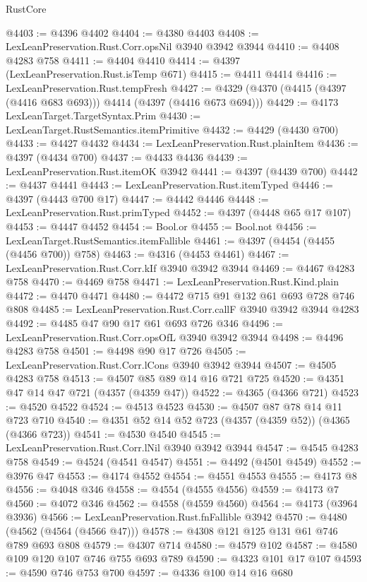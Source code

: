 \begin{lexlean}{RustCore}
\begin{coremodule}
@4403 := @4396 @4402
@4404 := @4380 @4403
@4408 := LexLeanPreservation.Rust.Corr.opsNil @3940 @3942 @3944
@4410 := @4408 @4283 @758
@4411 := @4404 @4410
@4414 := @4397 (LexLeanPreservation.Rust.isTemp @671)
@4415 := @4411 @4414
@4416 := LexLeanPreservation.Rust.tempFresh
@4427 := @4329 (@4370 (@4415 (@4397 (@4416 @683 @693))) @4414 (@4397 (@4416 @673 @694)))
@4429 := @4173 LexLeanTarget.TargetSyntax.Prim
@4430 := LexLeanTarget.RustSemantics.itemPrimitive
@4432 := @4429 (@4430 @700)
@4433 := @4427 @4432
@4434 := LexLeanPreservation.Rust.plainItem
@4436 := @4397 (@4434 @700)
@4437 := @4433 @4436
@4439 := LexLeanPreservation.Rust.itemOK @3942
@4441 := @4397 (@4439 @700)
@4442 := @4437 @4441
@4443 := LexLeanPreservation.Rust.itemTyped
@4446 := @4397 (@4443 @700 @17)
@4447 := @4442 @4446
@4448 := LexLeanPreservation.Rust.primTyped
@4452 := @4397 (@4448 @65 @17 @107)
@4453 := @4447 @4452
@4454 := Bool.or
@4455 := Bool.not
@4456 := LexLeanTarget.RustSemantics.itemFallible
@4461 := @4397 (@4454 (@4455 (@4456 @700)) @758)
@4463 := @4316 (@4453 @4461)
@4467 := LexLeanPreservation.Rust.Corr.kIf @3940 @3942 @3944
@4469 := @4467 @4283 @758
@4470 := @4469 @758
@4471 := LexLeanPreservation.Rust.Kind.plain
@4472 := @4470 @4471
@4480 := @4472 @715 @91 @132 @61 @693 @728 @746 @808
@4485 := LexLeanPreservation.Rust.Corr.callF @3940 @3942 @3944 @4283
@4492 := @4485 @47 @90 @17 @61 @693 @726 @346
@4496 := LexLeanPreservation.Rust.Corr.opsOfL @3940 @3942 @3944
@4498 := @4496 @4283 @758
@4501 := @4498 @90 @17 @726
@4505 := LexLeanPreservation.Rust.Corr.lCons @3940 @3942 @3944
@4507 := @4505 @4283 @758
@4513 := @4507 @85 @89 @14 @16 @721 @725
@4520 := @4351 @47 @14 @47 @721 (@4357 (@4359 @47))
@4522 := @4365 (@4366 @721)
@4523 := @4520 @4522
@4524 := @4513 @4523
@4530 := @4507 @87 @78 @14 @11 @723 @710
@4540 := @4351 @52 @14 @52 @723 (@4357 (@4359 @52)) (@4365 (@4366 @723))
@4541 := @4530 @4540
@4545 := LexLeanPreservation.Rust.Corr.lNil @3940 @3942 @3944
@4547 := @4545 @4283 @758
@4549 := @4524 (@4541 @4547)
@4551 := @4492 (@4501 @4549)
@4552 := @3976 @47
@4553 := @4174 @4552
@4554 := @4551 @4553
@4555 := @4173 @8
@4556 := @4048 @346
@4558 := @4554 (@4555 @4556)
@4559 := @4173 @7
@4560 := @4072 @346
@4562 := @4558 (@4559 @4560)
@4564 := @4173 (@3964 @3936)
@4566 := LexLeanPreservation.Rust.fnFallible @3942
@4570 := @4480 (@4562 (@4564 (@4566 @47)))
@4578 := @4308 @121 @125 @131 @61 @746 @789 @693 @808
@4579 := @4307 @714
@4580 := @4579 @102
@4587 := @4580 @109 @120 @107 @746 @755 @693 @789
@4590 := @4323 @101 @17 @107
@4593 := @4590 @746 @753 @700
@4597 := @4336 @100 @14 @16 @680

\end{coremodule}
\end{lexlean}
